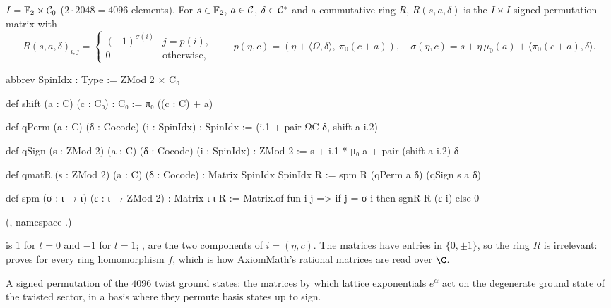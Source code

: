\begin{definition}\label{ch21:def:qmatR}
$I=\mathbb{F}_2\times\mathcal{C}_0$ ($2\cdot2048=4096$ elements).  For $s\in\mathbb{F}_2$, $a\in\mathcal{C}$, $\delta\in\mathcal{C}^*$
and a commutative ring $R$, $R(s,a,\delta)$ is the $I\times I$ signed permutation matrix with
\begin{equation*}
  R(s,a,\delta)_{i,j}=\begin{cases}(-1)^{\sigma(i)}&j=p(i),\\0&\text{otherwise,}\end{cases}\qquad
  p(\eta,c)=(\eta+\langle\Omega,\delta\rangle,\ \pi_0(c+a)),\quad
  \sigma(\eta,c)=s+\eta\,\mu_0(a)+\langle\pi_0(c+a),\delta\rangle .
\end{equation*}
\end{definition}
\begin{leancode}
abbrev SpinIdx : Type := ZMod 2 × C₀

def shift (a : C) (c : C₀) : C₀ := π₀ ((c : C) + a)
\end{leancode}
\begin{leancode}
def qPerm (a : C) (δ : Cocode) (i : SpinIdx) : SpinIdx :=
  (i.1 + pair ΩC δ, shift a i.2)

def qSign (s : ZMod 2) (a : C) (δ : Cocode) (i : SpinIdx) : ZMod 2 :=
  s + i.1 * μ₀ a + pair (shift a i.2) δ
\end{leancode}
\begin{leancode}
def qmatR (s : ZMod 2) (a : C) (δ : Cocode) : Matrix SpinIdx SpinIdx R :=
  spm R (qPerm a δ) (qSign s a δ)
\end{leancode}
\begin{leancode}
def spm (σ : ι → ι) (ε : ι → ZMod 2) : Matrix ι ι R :=
  Matrix.of fun i j => if j = σ i then sgnR R (ε i) else 0
\end{leancode}
(, namespace .)
\begin{dictionary}
 is $1$ for $t=0$ and $-1$ for $t=1$; ,  are the two components of
$i=(\eta,c)$.  The matrices have entries in $\{0,\pm1\}$, so the ring $R$ is irrelevant:
 proves  for every ring
homomorphism $f$, which is how AxiomMath's rational matrices are read over $\C$.
\end{dictionary}
\begin{physics}
A signed permutation of the $4096$ twist ground states: the matrices by which lattice exponentials
$e^\alpha$ act on the degenerate ground state of the twisted sector, in a basis where they permute
basis states up to sign.
\end{physics}
